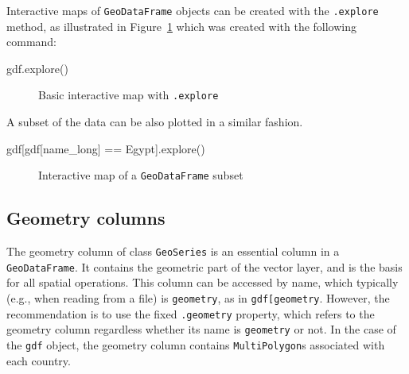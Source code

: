 \documentclass[
  letterpaper,
]{krantz}
\newenvironment{Shaded}{\begin{snugshade}}{\end{snugshade}}
\newcommand{\NormalTok}[1]{\textcolor[rgb]{0.00,0.23,0.31}{#1}}
\newcommand{\OperatorTok}[1]{\textcolor[rgb]{0.37,0.37,0.37}{#1}}
\newcommand{\StringTok}[1]{\textcolor[rgb]{0.13,0.47,0.30}{#1}}
\begin{document}
Interactive maps of \texttt{GeoDataFrame} objects can be created with
the \texttt{.explore} method, as illustrated in
Figure~\ref{fig-gdf-explore} which was created with the following
command:

\begin{Shaded}
\begin{Highlighting}[]
\NormalTok{gdf.explore()}
\end{Highlighting}
\end{Shaded}

\begin{figure}


\caption{\label{fig-gdf-explore}Basic interactive map with
\texttt{.explore}}

\end{figure}%

A subset of the data can be also plotted in a similar fashion.

\begin{Shaded}
\begin{Highlighting}[]
\NormalTok{gdf[gdf[}\StringTok{\textquotesingle{}name\_long\textquotesingle{}}\NormalTok{] }\OperatorTok{==} \StringTok{\textquotesingle{}Egypt\textquotesingle{}}\NormalTok{].explore()}
\end{Highlighting}
\end{Shaded}

\begin{figure}


\caption{\label{fig-gdf-explore2}Interactive map of a
\texttt{GeoDataFrame} subset}

\end{figure}%

\subsection{Geometry columns}\label{sec-geometry-columns}

The geometry column of class \texttt{GeoSeries} is an essential column
in a \texttt{GeoDataFrame}. It contains the geometric part of the vector
layer, and is the basis for all spatial operations. This column can be
accessed by name, which typically (e.g., when reading from a file) is
\texttt{\textquotesingle{}geometry\textquotesingle{}}, as in
\texttt{gdf{[}\textquotesingle{}geometry\textquotesingle{}{]}}. However,
the recommendation is to use the fixed \texttt{.geometry} property,
which refers to the geometry column regardless whether its name is
\texttt{\textquotesingle{}geometry\textquotesingle{}} or not. In the
case of the \texttt{gdf} object, the geometry column contains
\texttt{\textquotesingle{}MultiPolygon\textquotesingle{}}s associated
with each country.
\end{document}
